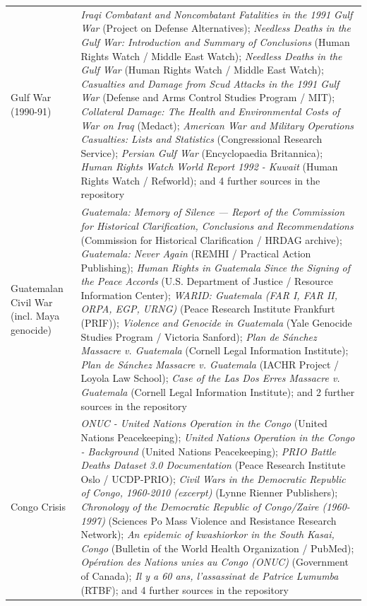 \documentclass[11pt]{article}
\begin{document}
\begin{scriptsize}
\begin{longtable}{p{3.5cm} p{12.5cm}}
\addlinespace
Gulf War (1990-91) & \emph{Iraqi Combatant and Noncombatant Fatalities in the 1991 Gulf War} (Project on Defense Alternatives); \emph{Needless Deaths in the Gulf War: Introduction and Summary of Conclusions} (Human Rights Watch / Middle East Watch); \emph{Needless Deaths in the Gulf War} (Human Rights Watch / Middle East Watch); \emph{Casualties and Damage from Scud Attacks in the 1991 Gulf War} (Defense and Arms Control Studies Program / MIT); \emph{Collateral Damage: The Health and Environmental Costs of War on Iraq} (Medact); \emph{American War and Military Operations Casualties: Lists and Statistics} (Congressional Research Service); \emph{Persian Gulf War} (Encyclopaedia Britannica); \emph{Human Rights Watch World Report 1992 - Kuwait} (Human Rights Watch / Refworld); and 4 further sources in the repository \\
\addlinespace
Guatemalan Civil War (incl. Maya genocide) & \emph{Guatemala: Memory of Silence — Report of the Commission for Historical Clarification, Conclusions and Recommendations} (Commission for Historical Clarification / HRDAG archive); \emph{Guatemala: Never Again} (REMHI / Practical Action Publishing); \emph{Human Rights in Guatemala Since the Signing of the Peace Accords} (U.S. Department of Justice / Resource Information Center); \emph{WARID: Guatemala (FAR I, FAR II, ORPA, EGP, URNG)} (Peace Research Institute Frankfurt (PRIF)); \emph{Violence and Genocide in Guatemala} (Yale Genocide Studies Program / Victoria Sanford); \emph{Plan de Sánchez Massacre v. Guatemala} (Cornell Legal Information Institute); \emph{Plan de Sánchez Massacre v. Guatemala} (IACHR Project / Loyola Law School); \emph{Case of the Las Dos Erres Massacre v. Guatemala} (Cornell Legal Information Institute); and 2 further sources in the repository \\
\addlinespace
Congo Crisis & \emph{ONUC - United Nations Operation in the Congo} (United Nations Peacekeeping); \emph{United Nations Operation in the Congo - Background} (United Nations Peacekeeping); \emph{PRIO Battle Deaths Dataset 3.0 Documentation} (Peace Research Institute Oslo / UCDP-PRIO); \emph{Civil Wars in the Democratic Republic of Congo, 1960-2010 (excerpt)} (Lynne Rienner Publishers); \emph{Chronology of the Democratic Republic of Congo/Zaire (1960-1997)} (Sciences Po Mass Violence and Resistance Research Network); \emph{An epidemic of kwashiorkor in the South Kasai, Congo} (Bulletin of the World Health Organization / PubMed); \emph{Opération des Nations unies au Congo (ONUC)} (Government of Canada); \emph{Il y a 60 ans, l’assassinat de Patrice Lumumba} (RTBF); and 4 further sources in the repository \\

\end{longtable}
\end{scriptsize}
\end{document}
